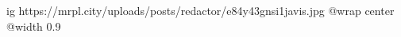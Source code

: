  
 
 
 
 

\ifcmt
  ig https://mrpl.city/uploads/posts/redactor/e84y43gnsi1javis.jpg
  @wrap center
  @width 0.9
\fi
